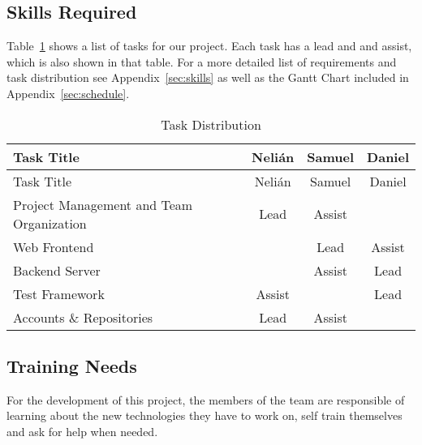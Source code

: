 \subsection{Skills Required}

Table~\ref{tasks} shows a list of tasks for our project. Each task has a lead and and assist, which is also shown in that table. For a more detailed list of requirements and task distribution see Appendix~\ref{sec:skills} as well as the Gantt Chart included in Appendix~\ref{sec:schedule}.

\begin{center}
\setlength{\extrarowheight}{1.5pt}
  \begin{longtable}{|m{3.25in}|c|c|c|}
 \caption{Task Distribution \label{tasks}} \\
   \hline
  
  \centering Task Title & Nelián & Samuel & Daniel \\
  \hline \hline \endfirsthead
  
     \hline

	\centering Task Title & Nelián & Samuel & Daniel \\  
	\hline \hline \endhead
  
  \endfoot  
  
  Project Management and Team Organization & Lead & Assist & \\ \hline
  Web Frontend & & Lead & Assist \\ \hline
  Backend Server & & Assist & Lead \\ \hline
  Test Framework & Assist & & Lead \\ \hline
  Accounts \& Repositories & Lead & Assist & \\ \hline
   \end{longtable}
\end{center}

\subsection{Training Needs}
For the development of this project, the members of the team are responsible of learning about the new technologies they have to work on, self train themselves and ask for help when needed.  

